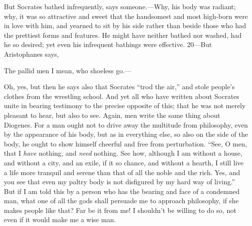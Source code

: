 But Socrates bathed infrequently, says someone.—Why, his body was radiant; why, it was so attractive and sweet that the handsomest and most high-born were in love with him, and yearned to sit by his side rather than beside those who had the prettiest forms and features. He might have neither bathed nor washed, had he so desired; yet even his infrequent bathings were effective. 20—But Aristophanes says,

The pallid men I mean, who shoeless go.—

Oh, yes, but then he says also that Socrates ``trod the air,'' and stole people's clothes from the wrestling school. And yet all who have written about Socrates unite in bearing testimony to the precise opposite of this; that he was not merely pleasant to hear, but also to see. Again, men write the same thing about Diogenes. For a man ought not to drive away the multitude from philosophy, even by the appearance of his body, but as in everything else, so also on the side of the body, he ought to show himself cheerful and free from perturbation. ``See, O men, that I \emph{have} nothing, and \emph{need} nothing. See how, although I am without a house, and without a city, and an exile, if it so chance, and without a hearth, I still live a life more tranquil and serene than that of all the noble and the rich. Yes, and you see that even my paltry body is not disfigured by my hard way of living.'' But if I am told this by a person who has the bearing and face of a condemned man, what one of all the gods shall persuade me to approach philosophy, if she makes people like that? Far be it from me! I shouldn't be willing to do so, not even if it would make me a wise man.

